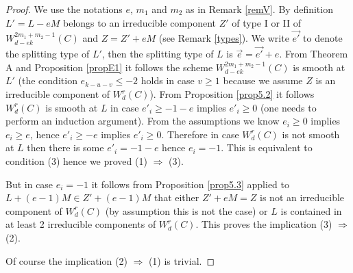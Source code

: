 \documentclass{article}
\theoremstyle{definition}
\theoremstyle{remark}
\begin{document}
\begin{proof}
We use the notations $e$, $m_1$ and $m_2$ as in Remark \ref{remV}.
By definition $L'=L-eM$ belongs to an irreducible component $Z'$ of type I or II of $W^{2m_1+m_2-1}_{d-ek}(C)$ and $Z=Z'+eM$ (see Remark \ref{types}).
We write $\overrightarrow {e'}$ to denote the splitting type of $L'$, then the splitting type of $L$ is $\overrightarrow {e}=\overrightarrow {e'}+e$.
From Theorem A and Proposition \ref{propE1} it follows the scheme $W^{2m_1+m_2-1}_{d-ek}(C)$ is smooth at $L'$ (the condition $e_{k-u-v} \leq -2$ holds in case $v\geq 1$ because we assume $Z$ is an irreducible component of $W^r_d(C)$).
From Proposition \ref{prop5.2} it follows $W^r_d(C)$ is smooth at $L$ in case $e'_i \geq -1-e$ implies $e'_i\geq 0$ (one needs to perform an induction argument).
From the assumptions we know $e_i \geq 0$ implies $e_i \geq e$, hence $e'_i \geq -e$ implies $e'_i \geq 0$.
Therefore in case $W^r_d(C)$ is not smooth at $L$ then there is some $e'_i=-1-e$ hence $e_i=-1$.
This is equivalent to condition (3) hence we proved (1) $\Rightarrow$ (3).

But in case $e_i=-1$ it follows from Proposition \ref{prop5.3} applied to $L+(e-1)M \in Z'+(e-1)M$ that either $Z'+eM=Z$ is not an irreducible component of $W^r_d(C)$ (by assumption this is not the case) or $L$ is contained in at least 2 irreducible components of $W^r_d(C)$.
This proves the implication (3) $\Rightarrow$ (2).

Of course the implication (2) $\Rightarrow$ (1) is trivial.
\end{proof}
\end{document}
